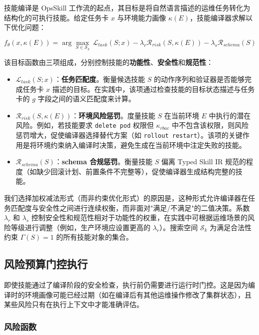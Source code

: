 \documentclass[11pt,a4paper]{ctexart}
\begin{document}
技能编译是 OpsSkill 工作流的起点，其目标是将自然语言描述的运维任务转化为结构化的可执行技能。给定任务卡 $x$ 与环境能力画像 $\kappa(E)$，技能编译器求解以下优化问题：

\begin{equation}
f_\theta(x, \kappa(E)) = \arg\max_{S \in \mathcal{S}_k} \, \mathcal{L}_{task}(S; x) - \lambda_r \mathcal{R}_{risk}(S, \kappa(E)) - \lambda_s \mathcal{R}_{schema}(S)
\end{equation}

\noindent 该目标函数由三项组成，分别控制技能的\textbf{功能性}、\textbf{安全性}和\textbf{规范性}：
\begin{itemize}[leftmargin=2em]
  \item $\mathcal{L}_{task}(S; x)$：\textbf{任务匹配度}。衡量候选技能 $S$ 的动作序列和验证器是否能够完成任务卡 $x$ 描述的目标。在实践中，该项通过检查技能的目标状态描述与任务卡的 $g$ 字段之间的语义匹配度来计算。
  \item $\mathcal{R}_{risk}(S, \kappa(E))$：\textbf{环境风险惩罚}。度量技能 $S$ 在当前环境 $E$ 中执行的潜在风险。例如，若技能要求 \texttt{delete pod} 权限但 $\kappa_{rbac}$ 中不包含该权限，则风险惩罚增大，促使编译器选择替代方案（如 \texttt{rollout restart}）。该项的关键作用是将环境约束纳入编译时决策，避免生成在当前环境中注定失败的技能。
  \item $\mathcal{R}_{schema}(S)$：\textbf{schema 合规惩罚}。衡量技能 $S$ 偏离 Typed Skill IR 规范的程度（如缺少回滚计划、前置条件不完整等），促使编译器生成结构完整的技能。
\end{itemize}

\noindent 我们选择加权减法形式（而非约束优化形式）的原因是，这种形式允许编译器在任务匹配度与安全性之间进行连续权衡，而非面对"满足/不满足"的二值决策。系数 $\lambda_r$ 和 $\lambda_s$ 控制安全性和规范性相对于功能性的权重，在实践中可根据运维场景的风险等级进行调整（例如，生产环境应设置更高的 $\lambda_r$）。搜索空间 $\mathcal{S}_k$ 为满足合法性约束 $\Gamma(S)=1$ 的所有技能对象的集合。

\subsection{风险预算门控执行}

即使技能通过了编译阶段的安全检查，执行前仍需要进行运行时门控。这是因为编译时的环境画像可能已经过期（如在编译后有其他运维操作修改了集群状态），且某些风险只有在执行上下文中才能准确评估。

\subsubsection{风险函数}
\end{document}
